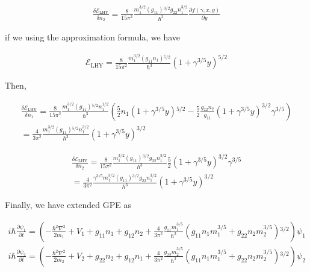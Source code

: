 \begin{equation}
\begin{split}
\frac{\delta  \mathcal{E}_{\text{LHY}}}{\delta  n_2}=\frac{8}{15\pi ^2}\frac{m_1^{3/2}\left(g_{11}\right){}^{3/2}g_{22}n_1^{3/2}}{\hbar ^3}\frac{\partial
f(\gamma ,x,y)}{\partial y}
\end{split}
\end{equation}

if we using the approximation formula, we have

\begin{equation}
\begin{split}
\mathcal{E}_{\text{LHY}}=\frac{8}{15\pi ^2}\frac{m_1^{3/2}\left(g_{11}n_1\right){}^{5/2}}{\hbar ^3}\left(1+\gamma ^{3/5}y\right)^{5/2}
\end{split}
\end{equation}

Then, 

\begin{equation}
\begin{split}
\frac{\delta  \mathcal{E}_{\text{LHY}}}{\delta  n_1}=\frac{8}{15\pi ^2}\frac{m_1^{3/2}\left(g_{11}\right){}^{5/2}n_1^{1/2}}{\hbar ^3}\left(\frac{5}{2}n_1\left(1+\gamma
^{3/5}y\right){}^{5/2}-\frac{5}{2}\frac{g_{22}n_2}{g_{11}}\left(1+\gamma ^{3/5}y\right)^{3/2}\gamma ^{3/5}\right)\\
=\frac{4}{3\pi ^2}\frac{m_1^{3/2}\left(g_{11}\right){}^{5/2}n_1^{3/2}}{\hbar ^3}\left(1+\gamma ^{3/5}y\right)^{3/2}
\end{split}
\end{equation}

\begin{equation}
\begin{split}
\frac{\delta  \mathcal{E}_{\text{LHY}}}{\delta  n_2}=\frac{8}{15\pi ^2}\frac{m_1^{3/2}\left(g_{11}\right){}^{3/2}g_{22}n_1^{3/2}}{\hbar ^3}\frac{5}{2}\left(1+\gamma
^{3/5}y\right)^{3/2}\gamma ^{3/5}\\
=\frac{4}{3\pi ^2}\frac{\gamma ^{3/5}m_1^{3/2}\left(g_{11}\right){}^{3/2}g_{22}n_1^{3/2}}{\hbar ^3}\left(1+\gamma ^{3/5}y\right)^{3/2}
\end{split}
\end{equation}

Finally, we have extended GPE as

\begin{equation}
\begin{split}
i \hbar \frac{\partial \psi _1}{\partial t}=\left(-\frac{\hbar ^2\nabla ^2}{2m_1}+V_1+g_{11}n_1+g_{12}n_2+\frac{4}{3\pi ^2}\frac{g_{11}m_1^{3/5}}{\hbar
^3}\left(g_{11}n_1m_1^{3/5}+g_{22}n_2m_2^{3/5}\right){}^{3/2}\right)\psi _1\\
i \hbar \frac{\partial \psi _2}{\partial t}=\left(-\frac{\hbar ^2\nabla ^2}{2m_2}+V_2+g_{22}n_2+g_{12}n_1+\frac{4}{3\pi ^2}\frac{g_{22}m_2^{3/5}}{\hbar
^3}\left(g_{11}n_1m_1^{3/5}+g_{22}n_2m_2^{3/5}\right){}^{3/2}\right)\psi _2
\end{split}
\end{equation}


